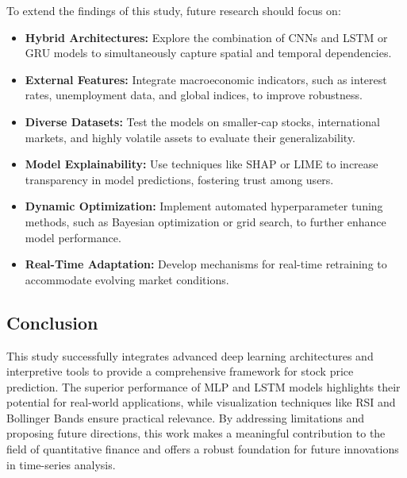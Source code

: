 \documentclass[conference]{IEEEtran}
\begin{document}
To extend the findings of this study, future research should focus on: \begin{itemize} \item \textbf{Hybrid Architectures:} Explore the combination of CNNs and LSTM or GRU models to simultaneously capture spatial and temporal dependencies. \item \textbf{External Features:} Integrate macroeconomic indicators, such as interest rates, unemployment data, and global indices, to improve robustness. \item \textbf{Diverse Datasets:} Test the models on smaller-cap stocks, international markets, and highly volatile assets to evaluate their generalizability. \item \textbf{Model Explainability:} Use techniques like SHAP or LIME to increase transparency in model predictions, fostering trust among users. \item \textbf{Dynamic Optimization:} Implement automated hyperparameter tuning methods, such as Bayesian optimization or grid search, to further enhance model performance. \item \textbf{Real-Time Adaptation:} Develop mechanisms for real-time retraining to accommodate evolving market conditions. \end{itemize}

\subsection{Conclusion}

This study successfully integrates advanced deep learning architectures and interpretive tools to provide a comprehensive framework for stock price prediction. The superior performance of MLP and LSTM models highlights their potential for real-world applications, while visualization techniques like RSI and Bollinger Bands ensure practical relevance. By addressing limitations and proposing future directions, this work makes a meaningful contribution to the field of quantitative finance and offers a robust foundation for future innovations in time-series analysis.
\end{document}
